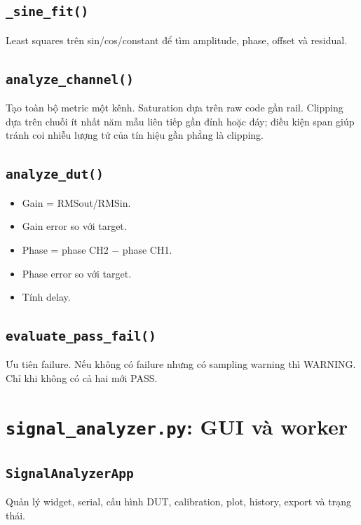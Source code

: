 \documentclass[12pt,a4paper,oneside]{article}
\newcommand{\inlinecode}[1]{\texttt{#1}}
\begin{document}
\subsection{\inlinecode{\_sine\_fit()}}

Least squares trên sin/cos/constant để tìm amplitude, phase, offset và residual.

\subsection{\inlinecode{analyze\_channel()}}

Tạo toàn bộ metric một kênh. Saturation dựa trên raw code gần rail. Clipping dựa trên chuỗi ít nhất năm mẫu liên tiếp gần đỉnh hoặc đáy; điều kiện span giúp tránh coi nhiễu lượng tử của tín hiệu gần phẳng là clipping.

\subsection{\inlinecode{analyze\_dut()}}

\begin{itemize}
\item Gain = RMSout/RMSin.
\item Gain error so với target.
\item Phase = phase CH2 − phase CH1.
\item Phase error so với target.
\item Tính delay.
\end{itemize}

\subsection{\inlinecode{evaluate\_pass\_fail()}}

Ưu tiên failure. Nếu không có failure nhưng có sampling warning thì WARNING. Chỉ khi không có cả hai mới PASS.

\section{\inlinecode{signal\_analyzer.py}: GUI và worker}

\subsection{\inlinecode{SignalAnalyzerApp}}

Quản lý widget, serial, cấu hình DUT, calibration, plot, history, export và trạng thái.
\end{document}
